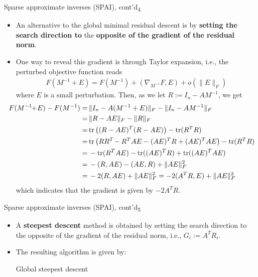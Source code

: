 \documentclass[t,usepdftitle=false]{beamer}
\begin{document}
\begin{frame}{Sparse approximate inverses (SPAI), cont'd\textsubscript{4}}
\begin{itemize}
\item An alternative to the global minimal residual descent is by \textbf{setting the search direction to} the \textbf{opposite of the gradient of the residual norm}.
\item[] One way to reveal this gradient is through Taylor expansion, i.e., the perturbed objective function reads
\begin{align*}
F(M^{-1}+E)=F(M^{-1})+(\nabla_{M^{-1}}F,E)+o(\|E\|_F)
\end{align*}
where $E$ is a small perturbation.
Then, as we let $R:=I_n-AM^{-1}$, we get
{\small\begin{align*}
\hspace{-.45cm}
F(M^{-1}\!\!+\!E)-F(M^{-1})
=&\,\|I_n-A(M^{-1}+E)\|_F-\|I_n-AM^{-1}\|_F\\
=&\,\|R-AE\|_F-\|R\|_F\\
=&\,\text{tr}\left((R-AE)^T(R-AE)\right)-\text{tr}(R^TR)\\
=&\,\text{tr}\left(RR^T\!-R^TAE-(AE)^TR+(AE)^TAE\right)-\text{tr}(R^TR)\\
=&\,-\text{tr}(R^TAE)-\text{tr}((AE)^TR)+\text{tr}((AE)^TAE)\\
=&\,-(R,AE)-(AE,R)+\|AE\|_F^2\\
=&\,-2(R,AE)+\|AE\|_F^2
=-2(A^TR,E)+\|AE\|_F^2
\end{align*}}
which indicates that the gradient is given by $-2A^TR$.
\end{itemize}
\end{frame}

\begin{frame}{Sparse approximate inverses (SPAI), cont'd\textsubscript{5}}
\begin{itemize}
\item A \textbf{steepest descent} method is obtained by setting the search direction to the opposite of the gradient of the residual norm, i.e., $G_i:=A^TR_i$.
\item[] The resulting algorithm is given by:\vspace{-.3cm}
\begin{algorithm}[H]
\small
\caption{Global steepest descent}
\begin{algorithmic}[1]
\ENDWHILE
\end{algorithmic}
\end{algorithm}
\end{itemize}
\end{frame}
\end{document}

